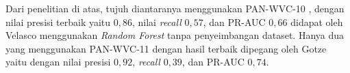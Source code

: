 Dari penelitian di atas, tujuh diantaranya menggunakan PAN-WVC-10
\cite{adler2010detecting}
\cite{adler2011wikipedia}
\cite{gotze2014advanced}
\cite{harpalani2011language}
\cite{mola2012wikipedia}
\cite{wang2010got}
\cite{west2011multilingual},
dengan nilai presisi terbaik yaitu $0,86$, nilai \textit{recall} $0,57$, dan
PR-AUC $0,66$ didapat oleh Velasco menggunakan \textit{Random Forest} tanpa
penyeimbangan dataset.
Hanya dua yang menggunakan PAN-WVC-11 \cite{gotze2014advanced}
\cite{west2011multilingual} dengan hasil terbaik dipegang oleh Gotze yaitu
dengan nilai presisi $0,92$, \textit{recall} $0,39$, dan PR-AUC $0,74$.
